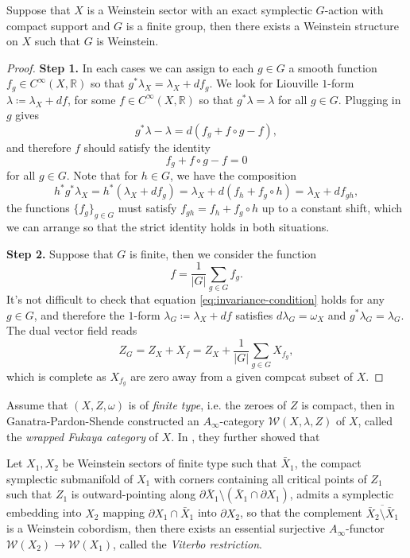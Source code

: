 \begin{lmm}
    Suppose that $X$ is a Weinstein sector with an exact symplectic $G$-action with compact support and $G$ is a finite group, then there exists a Weinstein structure on $X$ such that $G$ is Weinstein.
\end{lmm}
\begin{proof}
    \textbf{Step 1.} In each cases we can assign to each $g\in G$ a smooth function $f_g\in C^{\infty} (X,\mathbb{R})$ so that $g^{\ast}\lambda_X =\lambda_X +df_g$. We look for Liouville $1$-form $\lambda\coloneqq\lambda_X +df$, for some $f\in C^{\infty}(X,\mathbb{R})$ so that $g^{\ast}\lambda =\lambda$ for all $g\in G$. Plugging in $g$ gives \[
        g^{\ast}\lambda -\lambda =d(f_g +f\circ g-f),
    \]and therefore $f$ should satisfy the identity \begin{equation}\label{eq:invariance-condition}
        f_g +f\circ g-f=0
    \end{equation}for all $g\in G$. Note that for $h\in G$, we have the composition \[
        h^{\ast}g^{\ast}\lambda_X =h^{\ast} (\lambda_X +df_g)=\lambda_X +d(f_h +f_g\circ h)=\lambda_X +df_{gh},
    \]the functions $\{f_g\}_{g\in G}$ must satisfy $f_{gh}=f_h +f_g\circ h$ up to a constant shift, which we can arrange so that the strict identity holds in both situations.\par
    \textbf{Step 2.} Suppose that $G$ is finite, then we consider the function \[
        f=\frac{1}{\vert G\vert}\sum_{g\in G} f_g.
    \]It's not difficult to check that equation \eqref{eq:invariance-condition} holds for any $g\in G$, and therefore the $1$-form $\lambda_G\coloneqq\lambda_X +df$ satisfies $d\lambda_G =\omega_X$ and $g^{\ast}\lambda_G =\lambda_G$. The dual vector field reads \[
        Z_G =Z_X +X_f =Z_X+\frac{1}{\vert G\vert}\sum_{g\in G} X_{f_g},
    \]
    which is complete as $X_{f_g}$ are zero away from a given compcat subset of $X$.
\end{proof}
Assume that $(X,Z,\omega)$ is of \emph{finite type}, i.e. the zeroes of $Z$ is compact, then in \cite{GPS20} Ganatra-Pardon-Shende constructed an $A_{\infty}$-category $\mathcal{W} (X,\lambda ,Z)$ of $X$, called the \emph{wrapped Fukaya category} of $X$. In \cite{GPS24S}, they further showed that 
\begin{thm}\label{thm:Viterbo-restriction}
    Let $X_1, X_2$ be Weinstein sectors of finite type such that $\bar{X}_1$, the compact symplectic submanifold of $X_1$ with corners containing all critical points of $Z_1$ such that $Z_1$ is outward-pointing along $\partial\bar{X}_1\setminus (\bar{X}_1\cap\partial X_1)$, admits a symplectic embedding into $X_2$ mapping $\partial X_1\cap\bar{X}_1$ into $\partial X_2$, so that the complement $\overline{\bar{X}_2\setminus\bar{X}_1}$ is a Weinstein cobordism, then there exists an essential surjective $A_{\infty}$-functor $\mathcal{W} (X_2)\to\mathcal{W} (X_1)$, called the \emph{Viterbo restriction}.
\end{thm}
